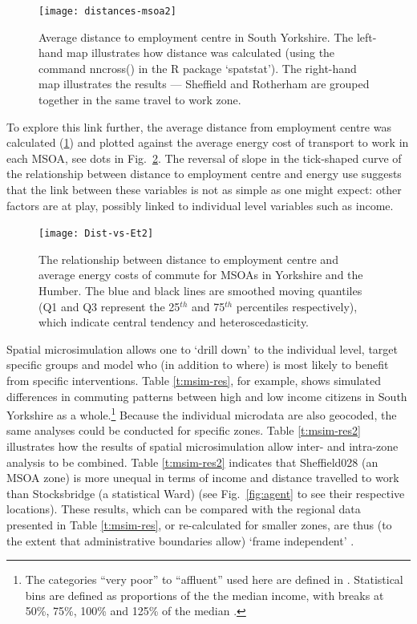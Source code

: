 \begin{figure}
\begin{center}
  \texttt{[image: distances-msoa2]}
\end{center}
\caption[Average distance to employment centre in South Yorkshire]{Average
distance to employment centre in South Yorkshire. The
left-hand map illustrates how distance was calculated (using the command
 nncross() in the R package `spatstat'). The right-hand map illustrates
the results --- Sheffield and Rotherham are grouped together in the same
travel to work zone.}
\label{fig:dis-msoa}
\end{figure}

To explore this link further, the average distance from employment
centre
was calculated (\ref{fig:dis-msoa})
and plotted against the average energy cost of transport to work in each MSOA,
see dots in Fig.~\ref{fig:dis-e}. The reversal of slope in the
tick-shaped curve of the relationship between distance to employment centre and
energy use suggests that the link between these variables is not as simple as
one might expect: other factors are at play, possibly linked to
individual level variables such as income.

\begin{figure}[h*]
 \centering
\texttt{[image: Dist-vs-Et2]}
 \caption[Scatter plot of distance vs energy costs in Yorkshire and the Humber]
 {The relationship between distance to employment centre and average
energy costs of commute for MSOAs in Yorkshire and the Humber. The blue and
black lines are smoothed moving quantiles (Q1 and Q3 represent the 25$^{th}$ and 75$^{th}$
percentiles respectively), which indicate central tendency and heteroscedasticity.}
 \label{fig:dis-e}
\end{figure}

Spatial microsimulation allows one to `drill down' to the individual
level, target specific groups and model who (in addition to where) is most
likely to benefit from specific interventions. Table \ref{t:msim-res}, for
example, shows simulated differences in commuting patterns between high
and low income citizens in South Yorkshire as a whole.\footnote{The categories
``very poor'' to ``affluent'' used here are defined in \citep{Ballas2005b}.
Statistical bins are defined as proportions of the the median income, with
breaks at 50\%, 75\%, 100\% and 125\% of the median \citep[p.~91]{Ballas2005b}.}
Because the individual
microdata are also geocoded, the same analyses could be conducted for
specific zones.
Table \ref{t:msim-res2} illustrates how the results of spatial microsimulation
allow inter- and intra-zone analysis to be combined. Table \ref{t:msim-res2}
indicates that Sheffield028 (an MSOA zone) is more unequal in terms of
income and distance travelled to work than Stocksbridge (a statistical Ward)
(see Fig.~\ref{fig:agent} to see their respective locations).
These results, which can be compared with the regional data presented
in Table \ref{t:msim-res}, or re-calculated for smaller zones, are thus
(to the extent that administrative boundaries allow)
`frame independent' \citep{Horner2002}.

